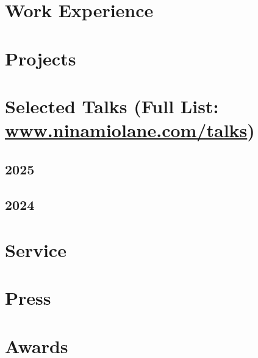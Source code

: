 \documentclass[a4paper,12pt]{article}
\begin{document}
\section{Work Experience}


\section{Projects}


\section{Selected Talks (Full List: \url{www.ninamiolane.com/talks})}

\subsection*{2025}
\subsection*{2024}

\section{Service}

\section{Press}

\section{Awards}







\vfill
{}
\end{document}
